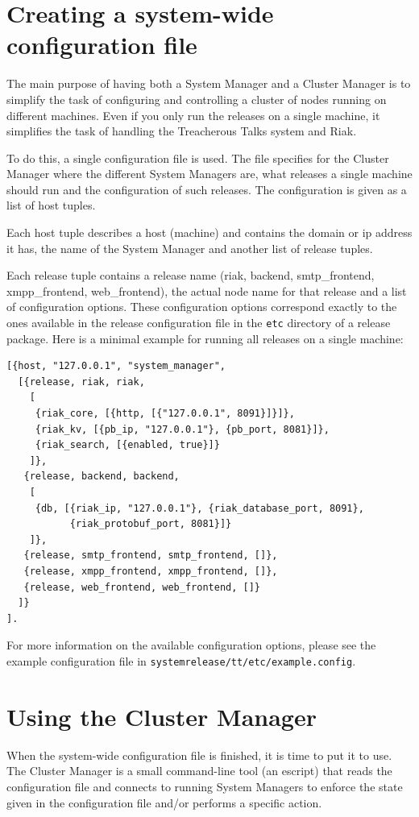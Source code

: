 \documentclass[11pt,a4paper]{report}
\begin{document}
\section{Creating a system-wide configuration file}
The main purpose of having both a System Manager and a Cluster Manager is to
simplify the task of configuring and controlling a cluster of nodes running on
different machines. Even if you only run the releases on a single machine, it
simplifies the task of handling the Treacherous Talks system and Riak.

To do this, a single configuration file is used. The file specifies for the
Cluster Manager where the different System Managers are, what releases a single
machine should run and the configuration of such releases. The configuration is
given as a list of host tuples.

Each host tuple describes a host (machine) and contains the domain or ip address
it has, the name of the System Manager and another list of release tuples.

Each release tuple contains a release name (riak, backend, smtp\_frontend,
xmpp\_frontend, web\_frontend), the actual node name for that release and a list
of configuration options. These configuration options correspond exactly to the
ones available in the release configuration file in the {\tt etc} directory of a
release package. Here is a minimal example for running all releases on a single
machine:

\begin{Verbatim}[samepage=true]
[{host, "127.0.0.1", "system_manager",
  [{release, riak, riak,
    [
     {riak_core, [{http, [{"127.0.0.1", 8091}]}]},
     {riak_kv, [{pb_ip, "127.0.0.1"}, {pb_port, 8081}]},
     {riak_search, [{enabled, true}]}
    ]},
   {release, backend, backend,
    [
     {db, [{riak_ip, "127.0.0.1"}, {riak_database_port, 8091},
           {riak_protobuf_port, 8081}]}
    ]},
   {release, smtp_frontend, smtp_frontend, []},
   {release, xmpp_frontend, xmpp_frontend, []},
   {release, web_frontend, web_frontend, []}
  ]}
].
\end{Verbatim}

\begin{sloppypar}
For more information on the available configuration options, please see the
example configuration file in {\tt system\-release/tt/etc/example.config}.
\end{sloppypar}
\section{Using the Cluster Manager}
When the system-wide configuration file is finished, it is time to put it to
use. The Cluster Manager is a small command-line tool (an escript) that reads
the configuration file and connects to running System Managers to enforce the
state given in the configuration file and/or performs a specific action.
\end{document}
